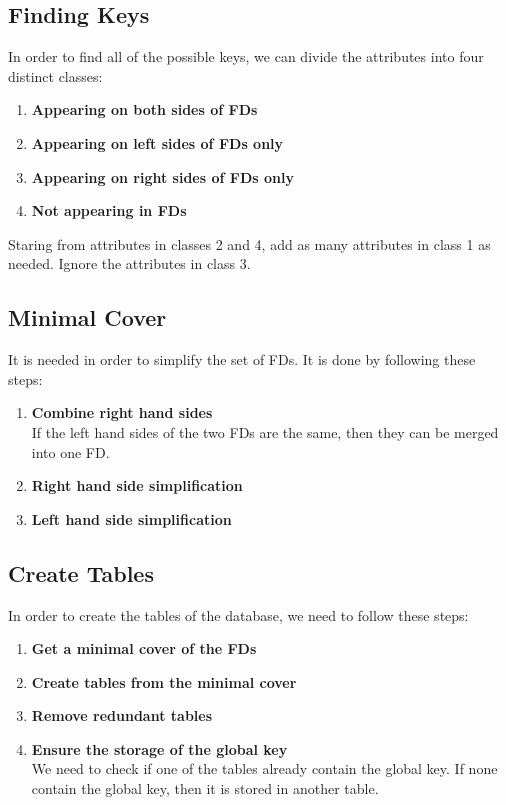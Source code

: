 \documentclass{article}
\begin{document}
\subsection{Finding Keys}
In order to find all of the possible keys, we can divide the attributes into four distinct classes:

\begin{enumerate}
	\item \textbf{Appearing on both sides of FDs}
	\item \textbf{Appearing on left sides of FDs only}
	\item \textbf{Appearing on right sides of FDs only}
	\item \textbf{Not appearing in FDs}
\end{enumerate}
Staring from attributes in classes 2 and 4, add as many attributes in class 1 as needed. Ignore the attributes in class 3.

\subsection{Minimal Cover}
It is needed in order to simplify the set of FDs. It is done by following these steps:

\begin{enumerate}
	\item \textbf{Combine right hand sides}
	\vspace{.2cm} \\
	If the left hand sides of the two FDs are the same, then they can be merged into one FD.
	
	\item \textbf{Right hand side simplification}
	
	\item \textbf{Left hand side simplification}
\end{enumerate}

\subsection{Create Tables}
In order to create the tables of the database, we need to follow these steps:

\begin{enumerate}
	\item \textbf{Get a minimal cover of the FDs}
	\item \textbf{Create tables from the minimal cover}
	\item \textbf{Remove redundant tables}
	\item \textbf{Ensure the storage of the global key}
	\vspace{.2cm} \\
	We need to check if one of the tables already contain the global key. If none contain the global key, then it is stored in another table.
\end{enumerate}
\end{document}

